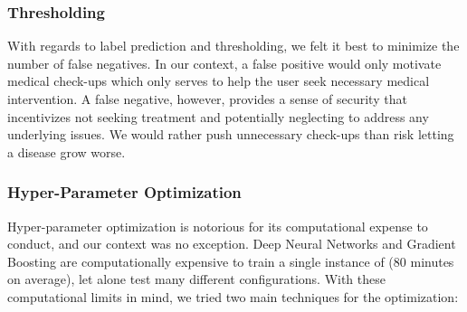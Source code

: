 \documentclass[conference]{IEEEtran}
\begin{document}
        \subsubsection{Thresholding}
        With regards to label prediction and thresholding, we felt it best to minimize the number of false negatives. In our context, a false positive would only motivate medical check-ups which only serves to help the user seek necessary medical intervention. A false negative, however, provides a sense of security that incentivizes not seeking treatment and potentially neglecting to address any underlying issues. We would rather push unnecessary check-ups than risk letting a disease grow worse.

        \subsubsection{Hyper-Parameter Optimization}
        Hyper-parameter optimization is notorious for its computational expense to conduct, and our context was no exception. Deep Neural Networks and Gradient Boosting are computationally expensive to train a single instance of (80 minutes on average), let alone test many different configurations. With these computational limits in mind, we tried two main techniques for the optimization:
\end{document}
